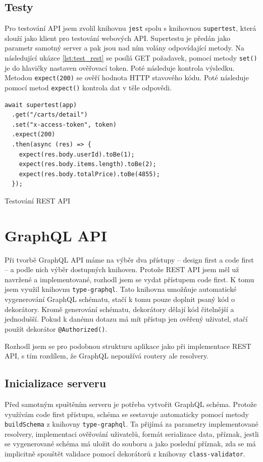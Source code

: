 \documentclass[thesis=M,czech]{FITthesis}[2019/12/23]
\begin{document}
\subsection{Testy}
Pro testování API jsem zvolil knihovnu \texttt{jest} spolu s knihovnou \texttt{supertest}, která slouží jako klient pro testování webových API. Supertestu je předán jako parametr samotný server a pak jsou nad ním volány odpovídající metody. Na následující ukázce \ref{lst:test_rest} se posílá GET požadavek, pomocí metody \texttt{set()} je do hlavičky nastaven ověřovací token. Poté následuje kontrola výsledku. Metodou \texttt{expect(200)} se ověří hodnota HTTP stavového kódu. Poté následuje pomocí metod \texttt{expect()} kontrola dat v těle odpovědi.

\begin{listing}[H]
\begin{verbatim}
await supertest(app)
  .get("/carts/detail")
  .set("x-access-token", token)
  .expect(200)
  .then(async (res) => {
    expect(res.body.userId).toBe(1);
    expect(res.body.items.length).toBe(2);
    expect(res.body.totalPrice).toBe(4855);
  });
\end{verbatim}
\caption{Testování REST API}
\label{lst:test_rest}
\end{listing}


\section{GraphQL API}
Při tvorbě GraphQL API máme na výběr dva přístupy -- design first a code first -- a podle nich výběr dostupných knihoven. Protože REST API jsem měl už navržené a implementované, rozhodl jsem se vydat přístupem code first. K tomu jsem využil knihovnu \texttt{type-graphql}. Tato knihovna umožňuje automatické vygenerování GraphQL schématu, stačí k tomu pouze doplnit psaný kód o dekorátory. Kromě generování schématu, dekorátory dělají kód čitelnější a jednodušší. Pokud k danému dotazu má mít přístup jen ověřený uživatel, stačí použít dekorátor \texttt{@Authorized()}.

Rozhodl jsem se pro podobnou strukturu aplikace jako při implementace REST API, s tím rozdílem, že GraphQL nepoužívá routery ale resolvery.

\subsection{Inicializace serveru}
Před samotným spuštěním serveru je potřeba vytvořit GraphQL schéma. Protože využívám code first přístupu, schéma se sestavuje automaticky pomocí metody \texttt{buildSchema} z knihovny \texttt{type-graphql}. Ta přijímá za parametry implementované resolvery, implementaci ověřování uživatelů, formát serializace data, příznak, jestli se vygenerované schéma má uložit do souboru a jako poslední příznak, zda se má implicitně spouštět validace pomocí dekorátorů z knihovny \texttt{class-validator}.
\end{document}
